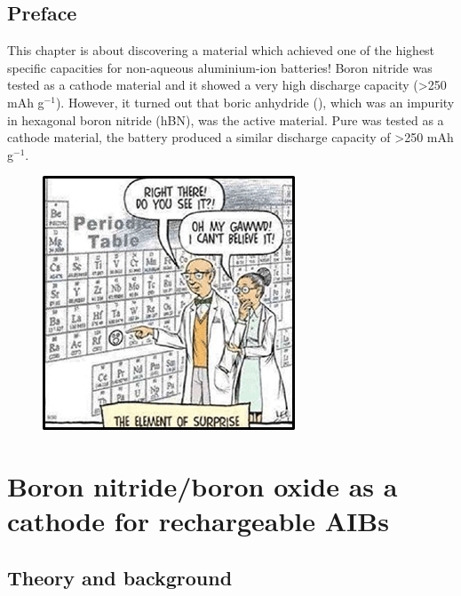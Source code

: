\section*{Preface}
This chapter is about discovering a material which achieved one of the highest specific capacities for non-aqueous aluminium-ion batteries! Boron nitride was tested as a cathode material and it showed a very high discharge capacity (>250 mAh g$^{-1}$). However, it turned out that boric anhydride (), which was an impurity in hexagonal boron nitride (hBN), was the active material. Pure  was tested as a cathode material, the battery produced a similar discharge capacity of >250 mAh g$^{-1}$.   

\begin{figure}[tbh!]
\centering
\includegraphics[width=\textwidth]{Figures/BOhBN/ah}
\end{figure}

\newpage
\chapter{Boron nitride/boron oxide as a cathode for rechargeable AIBs} 
\label{BOhBN} 

\section{Theory and background}


